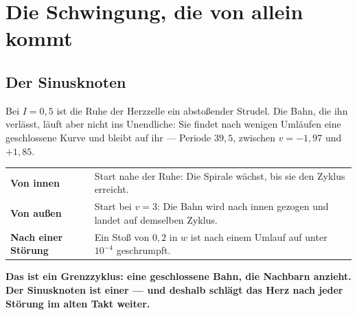 \chapter{Die Schwingung, die von allein kommt}

\section{Der Sinusknoten}

\begin{merksatz}
Bei $I = 0{,}5$ ist die Ruhe der Herzzelle ein abstoßender Strudel. Die Bahn, die ihn verlässt, läuft aber nicht ins Unendliche: Sie findet nach wenigen Umläufen eine geschlossene Kurve und bleibt auf ihr --- Periode $39{,}5$, zwischen $v = -1{,}97$ und $+1{,}85$.

\begin{center}
{\small
\renewcommand{\arraystretch}{1.5}
\begin{tabular}{@{}P{3.2cm}P{5.4cm}@{}}
\toprule
\textbf{Von innen} & Start nahe der Ruhe: Die Spirale wächst, bis sie den Zyklus erreicht.\\
\textbf{Von außen} & Start bei $v = 3$: Die Bahn wird nach innen gezogen und landet auf demselben Zyklus.\\
\textbf{Nach einer Störung} & Ein Stoß von $0{,}2$ in $w$ ist nach einem Umlauf auf unter $10^{-4}$ geschrumpft.\\
\bottomrule
\end{tabular}}
\end{center}

\begin{center}
\begin{minipage}{0.9\textwidth}
\textbf{Das ist ein Grenzzyklus: eine geschlossene Bahn, die Nachbarn anzieht. Der Sinusknoten ist einer --- und deshalb schlägt das Herz nach jeder Störung im alten Takt weiter.}
\end{minipage}
\end{center}

\begin{center}
\begin{minipage}{0.88\textwidth}
\end{minipage}
\end{center}
\end{merksatz}

